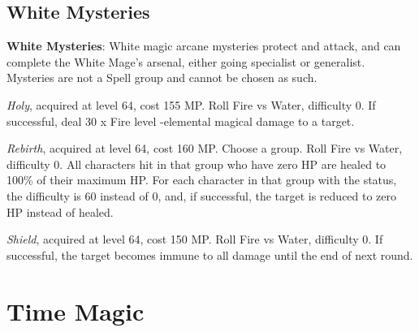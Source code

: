 \begin{multicols}{2}
    \subsection{White Mysteries}\label{subsec:white-mysteries}

    \textbf{White Mysteries}: White magic arcane mysteries protect and attack, and can complete the White Mage's arsenal, either going specialist or generalist. Mysteries are not a Spell group and cannot be chosen as such.

    \textit{Holy}, acquired at level 64, cost 155 MP\@. Roll Fire vs Water, difficulty 0. If successful, deal 30 x Fire level -elemental magical damage to a target.  

    \textit{Rebirth}, acquired at level 64, cost 160 MP\@. Choose a group. Roll Fire vs Water, difficulty 0. All characters hit in that group who have zero HP are healed to 100\% of their maximum HP\@. For each character in that group with the  status, the difficulty is 60 instead of 0, and, if successful, the target is reduced to zero HP instead of healed.

    \textit{Shield}, acquired at level 64, cost 150 MP\@. Roll Fire vs Water, difficulty 0. If successful, the target becomes immune to all damage until the end of next round.


\end{multicols}

\section{Time Magic}\label{sec:magic-time}

